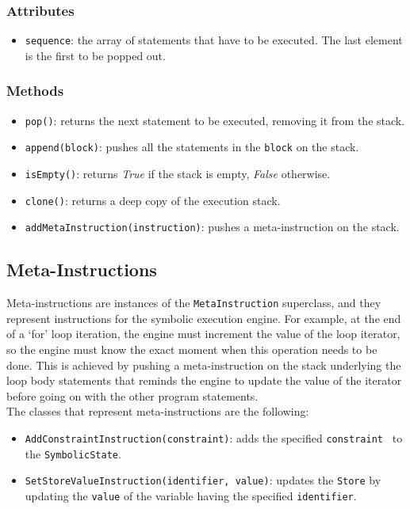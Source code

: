 \documentclass[12pt,a4paper]{report}
\theoremstyle{definition}
\theoremstyle{definition}
\theoremstyle{definition}
\begin{document}
\subsubsection{Attributes}
\begin{itemize}
    \itemsep 0em
    \item \texttt{sequence}: the array of statements that have to be executed. The last element is the first to be popped out.
\end{itemize}
\subsubsection{Methods}
\begin{itemize}
    \itemsep 0em
    \item \texttt{pop()}: returns the next statement to be executed, removing it from the stack.
    \item \texttt{append(block)}: pushes all the statements in the \texttt{block} on the stack.
    \item \texttt{isEmpty()}: returns \textit{True} if the stack is empty, \textit{False} otherwise.
    \item \texttt{clone()}: returns a deep copy of the execution stack.
    \item \texttt{addMetaInstruction(instruction)}: pushes a meta-instruction on the stack.
\end{itemize}


\subsection{Meta-Instructions}
Meta-instructions are instances of the \texttt{MetaInstruction} superclass, and they represent instructions for the symbolic execution engine. For example, at the end of a `for' loop iteration, the engine must increment the value of the loop iterator, so the engine must know the exact moment when this operation needs to be done. This is achieved by pushing a meta-instruction on the stack underlying the loop body statements that reminds the engine to update the value of the iterator before going on with the other program statements.\\
The classes that represent meta-instructions are the following:
\begin{itemize}
    \itemsep 0em
    \item \texttt{AddConstraintInstruction(constraint)}: adds the specified \texttt{constraint } to the \texttt{SymbolicState}.
    \item \texttt{SetStoreValueInstruction(identifier, value)}: updates the \texttt{Store} by updating the \texttt{value} of the variable having the specified \texttt{identifier}.
\end{itemize}
\end{document}

